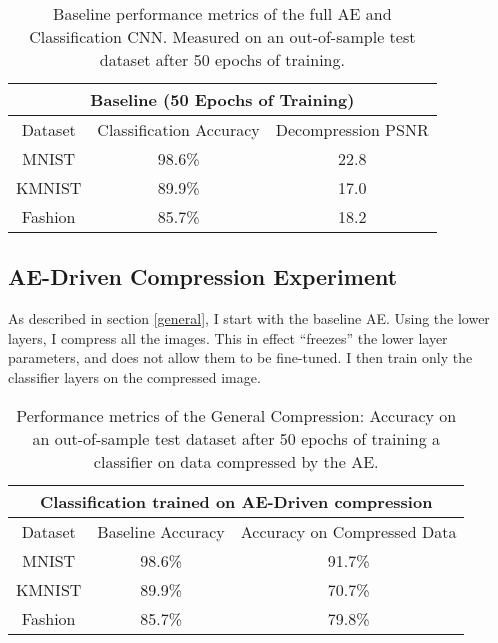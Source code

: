 \documentclass[twoside,11pt]{article}
\begin{document}

\begin{table}[h]
  \centering
  \begin{tabular}{|c||c|c|}
    \hline
    \multicolumn{3}{|c|}{Baseline (50 Epochs of Training)}\\
    \hline
    Dataset & Classification Accuracy & Decompression PSNR \\
    \hline
    MNIST & 98.6\% & 22.8\\
    \hline
    KMNIST & 89.9\% & 17.0\\
    \hline
    Fashion & 85.7\% & 18.2\\
    \hline
  \end{tabular}
  \caption{Baseline performance metrics of the full AE and Classification CNN. 
   Measured on an out-of-sample test dataset after 50 epochs of training.}
  \label{table:base}
\end{table}

\subsection{AE-Driven Compression Experiment} \label{expAE}

As described in section \ref{general}, I start with the baseline AE.
Using the lower layers, I compress all the images. This in effect ``freezes'' the 
lower layer parameters, and does not allow them to be fine-tuned. 
I then train only the classifier layers on the compressed image.


\begin{table}[h]
  \centering
  \begin{tabular}{|c||c|c|}
    \hline
    \multicolumn{3}{|c|}{Classification trained on AE-Driven compression}\\
    \hline
    Dataset & Baseline Accuracy & Accuracy on Compressed Data \\
    \hline
    MNIST & 98.6\% & 91.7\%\\
    \hline
    KMNIST & 89.9\% & 70.7\%\\
    \hline
    Fashion & 85.7\% & 79.8\%\\
    \hline
  \end{tabular}
  \caption{Performance metrics of the General Compression: 
   Accuracy on an out-of-sample test dataset after 50 epochs of training a classifier on
   data compressed by the AE.}
  \label{table:general}
\end{table}
\end{document}
